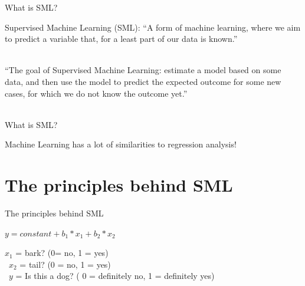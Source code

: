 \documentclass[handout]{beamer}
\begin{document}
\begin{frame}{What is SML?} 
	
	Supervised Machine Learning (SML): “A form of machine learning, where we aim to predict a variable that, for a least part of our data is known.” \\\
	
	“The goal of Supervised Machine Learning: estimate a model based on some data, and then use the model to predict the expected outcome for some new cases, for which we do not know the outcome yet.” \\\
	
	\begin{tiny}
	\end{tiny}

	
	


\end{frame}

\begin{frame}{What is SML?} 
	
	Machine Learning has a lot of similarities to regression analysis!
	
	
\end{frame}


\section{The principles behind SML}

\begin{frame}{The principles behind SML} 
	
	\(y = constant + b_1 * x_1 + b_2 * x_2\) 
	
    \(x_1\) = bark? (0= no, 1 = yes) \\\
	\(x_2\) = tail? (0 = no, 1 = yes) \\\
	\(y\) = Is this a dog? ( 0 = definitely no, 1 = definitely yes)
	
	
\end{frame}
\end{document}
